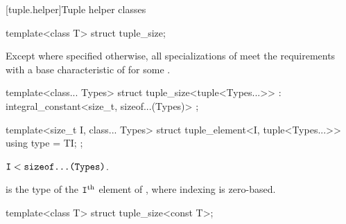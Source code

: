 [tuple.helper]{Tuple helper classes}

%
\begin{itemdecl}
template<class T> struct tuple_size;
\end{itemdecl}

\begin{itemdescr}
\pnum
Except where specified otherwise,
all specializations of  meet the
 requirements with a
base characteristic of 
for some .
\end{itemdescr}

%
\begin{itemdecl}
template<class... Types>
  struct tuple_size<tuple<Types...>> : integral_constant<size_t, sizeof...(Types)> { };
\end{itemdecl}

%
\begin{itemdecl}
template<size_t I, class... Types>
  struct tuple_element<I, tuple<Types...>> {
    using type = TI;
  };
\end{itemdecl}

\begin{itemdescr}
\pnum
\mandates
$\tcode{I} < \tcode{sizeof...(Types)}$.

\pnum
\result
{} is the
type of the $\tcode{I}^\text{th}$ element of ,
where indexing is zero-based.
\end{itemdescr}

%
\begin{itemdecl}
template<class T> struct tuple_size<const T>;
\end{itemdecl}


